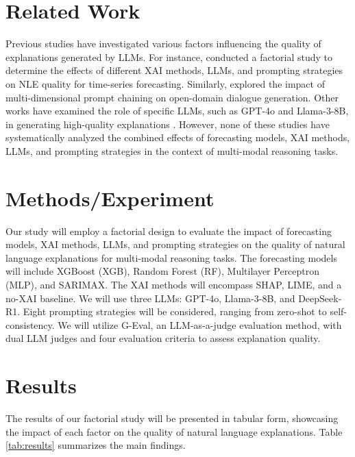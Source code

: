 \section{Related Work}
\label{sec:related_work}
Previous studies have investigated various factors influencing the quality of explanations generated by LLMs. For instance, \cite{lukassen2026xaistoriesfactorialstudy} conducted a factorial study to determine the effects of different XAI methods, LLMs, and prompting strategies on NLE quality for time-series forecasting. Similarly, \cite{teng2026multidimensionalpromptchainingimprove} explored the impact of multi-dimensional prompt chaining on open-domain dialogue generation. Other works have examined the role of specific LLMs, such as GPT-4o and Llama-3-8B, in generating high-quality explanations \cite{tomar2026doesprefixmatterreasoning}. However, none of these studies have systematically analyzed the combined effects of forecasting models, XAI methods, LLMs, and prompting strategies in the context of multi-modal reasoning tasks.

\section{Methods/Experiment}
\label{sec:methods}
Our study will employ a factorial design to evaluate the impact of forecasting models, XAI methods, LLMs, and prompting strategies on the quality of natural language explanations for multi-modal reasoning tasks. The forecasting models will include XGBoost (XGB), Random Forest (RF), Multilayer Perceptron (MLP), and SARIMAX. The XAI methods will encompass SHAP, LIME, and a no-XAI baseline. We will use three LLMs: GPT-4o, Llama-3-8B, and DeepSeek-R1. Eight prompting strategies will be considered, ranging from zero-shot to self-consistency. We will utilize G-Eval, an LLM-as-a-judge evaluation method, with dual LLM judges and four evaluation criteria to assess explanation quality.

\section{Results}
\label{sec:results}
The results of our factorial study will be presented in tabular form, showcasing the impact of each factor on the quality of natural language explanations. Table \ref{tab:results} summarizes the main findings.

